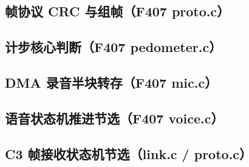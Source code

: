 \subsection{帧协议 CRC 与组帧（F407 proto.c）}


\subsection{计步核心判断（F407 pedometer.c）}


\subsection{DMA 录音半块转存（F407 mic.c）}


\subsection{语音状态机推进节选（F407 voice.c）}


\subsection{C3 帧接收状态机节选（link.c / proto.c）}

